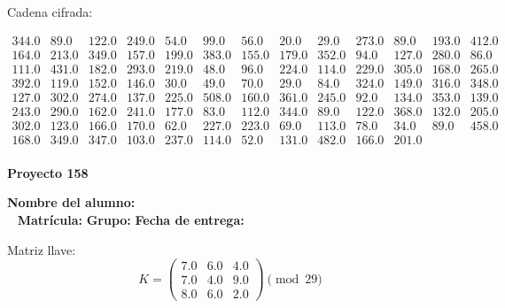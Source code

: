 \documentclass[12pt]{article}
\begin{document}
Cadena cifrada:
\begin{center}
$\begin{array}{lllllllllllll}
344.0 & 89.0 & 122.0 & 249.0 & 54.0 & 99.0 & 56.0 & 20.0 & 29.0 & 273.0 & 89.0 & 193.0 & 412.0\\
164.0 & 213.0 & 349.0 & 157.0 & 199.0 & 383.0 & 155.0 & 179.0 & 352.0 & 94.0 & 127.0 & 280.0 & 86.0\\
111.0 & 431.0 & 182.0 & 293.0 & 219.0 & 48.0 & 96.0 & 224.0 & 114.0 & 229.0 & 305.0 & 168.0 & 265.0\\
392.0 & 119.0 & 152.0 & 146.0 & 30.0 & 49.0 & 70.0 & 29.0 & 84.0 & 324.0 & 149.0 & 316.0 & 348.0\\
127.0 & 302.0 & 274.0 & 137.0 & 225.0 & 508.0 & 160.0 & 361.0 & 245.0 & 92.0 & 134.0 & 353.0 & 139.0\\
243.0 & 290.0 & 162.0 & 241.0 & 177.0 & 83.0 & 112.0 & 344.0 & 89.0 & 122.0 & 368.0 & 132.0 & 205.0\\
302.0 & 123.0 & 166.0 & 170.0 & 62.0 & 227.0 & 223.0 & 69.0 & 113.0 & 78.0 & 34.0 & 89.0 & 458.0\\
168.0 & 349.0 & 347.0 & 103.0 & 237.0 & 114.0 & 52.0 & 131.0 & 482.0 & 166.0 & 201.0\\
\end{array}$
\end{center}

\newpage


\textbf{Proyecto 158}

\textbf{Nombre del alumno:} \underline{\hspace{13cm}}\\\
\vspace{1cm}
\textbf{Matrícula:} \underline{\hspace{4cm}} \hspace{1cm}
\textbf{Grupo:} \underline{\hspace{2cm}}
\textbf{Fecha de entrega:} \underline{\hspace{2cm}}

\medskip

Matriz llave:
\[
K = \begin{pmatrix}
7.0 & 6.0 & 4.0\\
7.0 & 4.0 & 9.0\\
8.0 & 6.0 & 2.0
\end{pmatrix} \pmod{29}
\]
\end{document}
